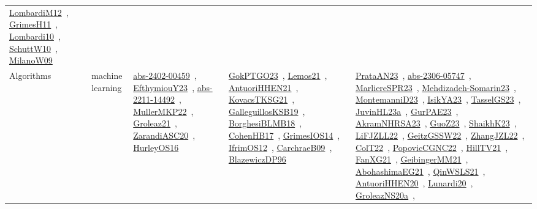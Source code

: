 {\begin{longtable}{lp{3cm}>{\raggedright\arraybackslash}p{6cm}>{\raggedright\arraybackslash}p{6cm}>{\raggedright\arraybackslash}p{8cm}}
\href{../works/LombardiM12.pdf}{LombardiM12}~\cite{LombardiM12}, \href{../works/GrimesH11.pdf}{GrimesH11}~\cite{GrimesH11}, \href{../works/Lombardi10.pdf}{Lombardi10}~\cite{Lombardi10}, \href{../works/SchuttW10.pdf}{SchuttW10}~\cite{SchuttW10}, \href{../works/MilanoW09.pdf}{MilanoW09}~\cite{MilanoW09}\\
Algorithms & machine learning & \href{../works/abs-2402-00459.pdf}{abs-2402-00459}~\cite{abs-2402-00459}, \href{../works/EfthymiouY23.pdf}{EfthymiouY23}~\cite{EfthymiouY23}, \href{../works/abs-2211-14492.pdf}{abs-2211-14492}~\cite{abs-2211-14492}, \href{../works/MullerMKP22.pdf}{MullerMKP22}~\cite{MullerMKP22}, \href{../works/Groleaz21.pdf}{Groleaz21}~\cite{Groleaz21}, \href{../works/ZarandiASC20.pdf}{ZarandiASC20}~\cite{ZarandiASC20}, \href{../works/HurleyOS16.pdf}{HurleyOS16}~\cite{HurleyOS16} & \href{../works/GokPTGO23.pdf}{GokPTGO23}~\cite{GokPTGO23}, \href{../works/Lemos21.pdf}{Lemos21}~\cite{Lemos21}, \href{../works/AntuoriHHEN21.pdf}{AntuoriHHEN21}~\cite{AntuoriHHEN21}, \href{../works/KovacsTKSG21.pdf}{KovacsTKSG21}~\cite{KovacsTKSG21}, \href{../works/GalleguillosKSB19.pdf}{GalleguillosKSB19}~\cite{GalleguillosKSB19}, \href{../works/BorghesiBLMB18.pdf}{BorghesiBLMB18}~\cite{BorghesiBLMB18}, \href{../works/CohenHB17.pdf}{CohenHB17}~\cite{CohenHB17}, \href{../works/GrimesIOS14.pdf}{GrimesIOS14}~\cite{GrimesIOS14}, \href{../works/IfrimOS12.pdf}{IfrimOS12}~\cite{IfrimOS12}, \href{../works/CarchraeB09.pdf}{CarchraeB09}~\cite{CarchraeB09}, \href{../works/BlazewiczDP96.pdf}{BlazewiczDP96}~\cite{BlazewiczDP96} & \href{../works/PrataAN23.pdf}{PrataAN23}~\cite{PrataAN23}, \href{../works/abs-2306-05747.pdf}{abs-2306-05747}~\cite{abs-2306-05747}, \href{../works/MarliereSPR23.pdf}{MarliereSPR23}~\cite{MarliereSPR23}, \href{../works/Mehdizadeh-Somarin23.pdf}{Mehdizadeh-Somarin23}~\cite{Mehdizadeh-Somarin23}, \href{../works/MontemanniD23.pdf}{MontemanniD23}~\cite{MontemanniD23}, \href{../works/IsikYA23.pdf}{IsikYA23}~\cite{IsikYA23}, \href{../works/TasselGS23.pdf}{TasselGS23}~\cite{TasselGS23}, \href{../works/JuvinHL23a.pdf}{JuvinHL23a}~\cite{JuvinHL23a}, \href{../works/GurPAE23.pdf}{GurPAE23}~\cite{GurPAE23}, \href{../works/AkramNHRSA23.pdf}{AkramNHRSA23}~\cite{AkramNHRSA23}, \href{../works/GuoZ23.pdf}{GuoZ23}~\cite{GuoZ23}, \href{../works/ShaikhK23.pdf}{ShaikhK23}~\cite{ShaikhK23}, \href{../works/LiFJZLL22.pdf}{LiFJZLL22}~\cite{LiFJZLL22}, \href{../works/GeitzGSSW22.pdf}{GeitzGSSW22}~\cite{GeitzGSSW22}, \href{../works/ZhangJZL22.pdf}{ZhangJZL22}~\cite{ZhangJZL22}, \href{../works/ColT22.pdf}{ColT22}~\cite{ColT22}, \href{../works/PopovicCGNC22.pdf}{PopovicCGNC22}~\cite{PopovicCGNC22}, \href{../works/HillTV21.pdf}{HillTV21}~\cite{HillTV21}, \href{../works/FanXG21.pdf}{FanXG21}~\cite{FanXG21}, \href{../works/GeibingerMM21.pdf}{GeibingerMM21}~\cite{GeibingerMM21}, \href{../works/AbohashimaEG21.pdf}{AbohashimaEG21}~\cite{AbohashimaEG21}, \href{../works/QinWSLS21.pdf}{QinWSLS21}~\cite{QinWSLS21}, \href{../works/AntuoriHHEN20.pdf}{AntuoriHHEN20}~\cite{AntuoriHHEN20}, \href{../works/Lunardi20.pdf}{Lunardi20}~\cite{Lunardi20}, \href{../works/GroleazNS20a.pdf}{GroleazNS20a}~\cite{GroleazNS20a}, 
\end{longtable}}
